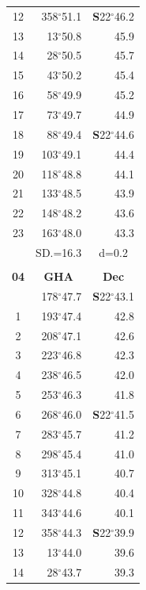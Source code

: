 \documentclass[10pt, a4paper]{report}
\begin{document}
\begin{scriptsize}
\begin{tabular*}{0.2\textwidth}[t]{@{\extracolsep{\fill}}|c|rr|}
12 & 358$^\circ$51.1 & \textbf{S}22$^\circ$46.2\\
13 & 13$^\circ$50.8 & 45.9\\
14 & 28$^\circ$50.5 & 45.7\\
15 & 43$^\circ$50.2 & \raisebox{0.24ex}{\boldmath$\cdot$~\boldmath$\cdot$~~}45.4\\
16 & 58$^\circ$49.9 & 45.2\\
17 & 73$^\circ$49.7 & 44.9\\[2Pt]
18 & 88$^\circ$49.4 & \textbf{S}22$^\circ$44.6\\
19 & 103$^\circ$49.1 & 44.4\\
20 & 118$^\circ$48.8 & 44.1\\
21 & 133$^\circ$48.5 & \raisebox{0.24ex}{\boldmath$\cdot$~\boldmath$\cdot$~~}43.9\\
22 & 148$^\circ$48.2 & 43.6\\
23 & 163$^\circ$48.0 & 43.3\\
\hline
\rule{0pt}{2.4ex} & \multicolumn{1}{c}{SD.=16.3} & \multicolumn{1}{c|}{d=0.2}\\
\hline
\multicolumn{1}{c}{}\\[-0.5ex]\hline
\multicolumn{1}{|c|}{\rule{0pt}{2.6ex}\textbf{04}} & \multicolumn{1}{c}{\textbf{GHA}} & \multicolumn{1}{c|}{\textbf{Dec}}\\
\hline\rule{0pt}{2.6ex}\noindent
0 & 178$^\circ$47.7 & \textbf{S}22$^\circ$43.1\\
1 & 193$^\circ$47.4 & 42.8\\
2 & 208$^\circ$47.1 & 42.6\\
3 & 223$^\circ$46.8 & \raisebox{0.24ex}{\boldmath$\cdot$~\boldmath$\cdot$~~}42.3\\
4 & 238$^\circ$46.5 & 42.0\\
5 & 253$^\circ$46.3 & 41.8\\[2Pt]
6 & 268$^\circ$46.0 & \textbf{S}22$^\circ$41.5\\
7 & 283$^\circ$45.7 & 41.2\\
8 & 298$^\circ$45.4 & 41.0\\
9 & 313$^\circ$45.1 & \raisebox{0.24ex}{\boldmath$\cdot$~\boldmath$\cdot$~~}40.7\\
10 & 328$^\circ$44.8 & 40.4\\
11 & 343$^\circ$44.6 & 40.1\\[2Pt]
12 & 358$^\circ$44.3 & \textbf{S}22$^\circ$39.9\\
13 & 13$^\circ$44.0 & 39.6\\
14 & 28$^\circ$43.7 & 39.3\\

\end{tabular*}
\end{scriptsize}
\end{document}
